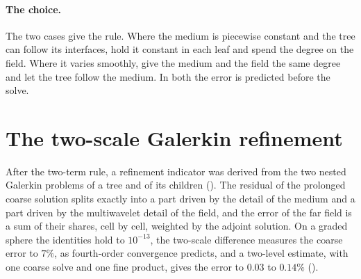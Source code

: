 \documentclass[11pt,a4paper]{article}
\begin{document}
\paragraph{The choice.} The two cases give the rule. Where the medium is piecewise constant and the
tree can follow its interfaces, hold it constant in each leaf and spend the degree on the field.
Where it varies smoothly, give the medium and the field the same degree and let the tree follow the
medium. In both the error is predicted before the solve.

\section{The two-scale Galerkin refinement}\label{sec:twoscale}

After the two-term rule, a refinement indicator was derived from the two nested Galerkin problems of a
tree and of its children (). The residual of the prolonged
coarse solution splits exactly into a part driven by the detail of the medium and a part driven by the
multiwavelet detail of the field, and the error of the far field is a sum of their shares, cell by cell,
weighted by the adjoint solution. On a graded sphere the identities hold to $10^{-13}$, the two-scale
difference measures the coarse error to $7\%$, as fourth-order convergence predicts, and a two-level
estimate, with one coarse solve and one fine product, gives the error to $0.03$ to $0.14\%$
().
\end{document}
